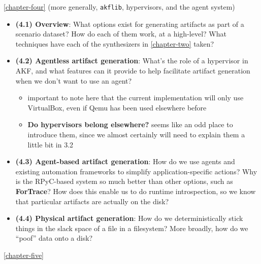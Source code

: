 \autoref{chapter-four} (more generally,
\passthrough{\lstinline!akflib!}, hypervisors, and the agent system)

\begin{itemize}
\tightlist
\item
  \textbf{(4.1) Overview}: What options exist for generating artifacts
  as part of a scenario dataset? How do each of them work, at a
  high-level? What techniques have each of the synthesizers in
  \autoref{chapter-two} taken?
\item
  \textbf{(4.2) Agentless artifact generation}: What's the role of a
  hypervisor in AKF, and what features can it provide to help facilitate
  artifact generation when we don't want to use an agent?

  \begin{itemize}
  \tightlist
  \item
    important to note here that the current implementation will only use
    VirtualBox, even if Qemu has been used elsewhere before
  \item
    \textbf{Do hypervisors belong elsewhere?} seems like an odd place to
    introduce them, since we almost certainly will need to explain them
    a little bit in 3.2
  \end{itemize}
\item
  \textbf{(4.3) Agent-based artifact generation}: How do we use agents
  and existing automation frameworks to simplify application-specific
  actions? Why is the RPyC-based system so much better than other
  options, such as \textbf{ForTrace}? How does this enable us to do
  runtime introspection, so we know that particular artifacts are
  actually on the disk?
\item
  \textbf{(4.4) Physical artifact generation}: How do we
  deterministically stick things in the slack space of a file in a
  filesystem? More broadly, how do we ``poof'' data onto a disk?
\end{itemize}

\autoref{chapter-five}


